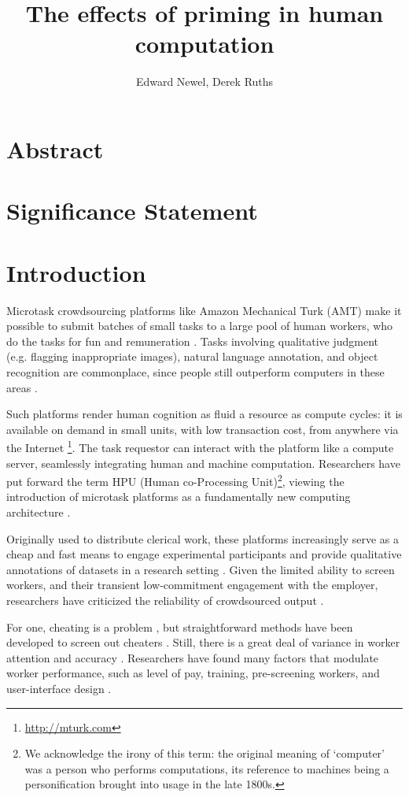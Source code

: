 \documentclass[a4paper]{report}
\title{The effects of priming in human computation}
\author{Edward Newel, Derek Ruths}
\begin{document}
\maketitle
\section*{Abstract}
\section*{Significance Statement}
\section*{Introduction}

Microtask crowdsourcing platforms like Amazon Mechanical Turk (AMT) make it 
possible to submit batches of small tasks to a large pool of human workers, 
who do the tasks for fun and remuneration \cite{kazai2013analysis}.  Tasks 
involving qualitative
judgment (e.g. flagging inappropriate images), natural language annotation,
and object recognition are commonplace, since people still outperform  
computers in these areas \cite{yuen2011survey}.

Such platforms render human cognition as fluid a resource as compute cycles: 
it is available on demand in small units, with low transaction cost, from 
anywhere via the Internet \footnote{\href{http://mturk.com}{http://mturk.com}}.
The task requestor can interact with the platform like a compute server, 
seamlessly 
integrating human and machine computation.  Researchers have put forward the 
term HPU (Human co-Processing Unit)\footnote{We acknowledge the irony of this 
term: the original meaning of `computer' was a person who performs 
computations, its reference to machines being a personification brought into 
usage in the late 1800s\cite{Dictionary:hl}.}, viewing the introduction of 
microtask platforms as a fundamentally new computing architecture
\cite{5543192}.  

Originally used to distribute clerical work, these platforms 
increasingly serve as a cheap and fast means to engage experimental 
participants and provide qualitative annotations of datasets in a research 
setting \cite{snow2008cheap}.  Given the limited ability to screen workers, and their transient 
low-commitment engagement with the employer, researchers have criticized the
reliability of crowdsourced output \cite{marsden2009crowdsourcing}.  

For one, cheating
is a problem \cite{lease2011quality}, but straightforward methods have been 
developed to screen out cheaters \cite{snow2008cheap, kazai2013analysis}.
Still, there is a great deal of variance in worker attention and 
accuracy \cite{kazai2013analysis}.  Researchers have found many factors that 
modulate worker performance, such as level of pay\cite{kazai2013analysis}, 
training\cite{le2010ensuring}, pre-screening 
workers\cite{paolacci2010running}, and user-interface design
\cite{Finnerty2013}.
\end{document}
